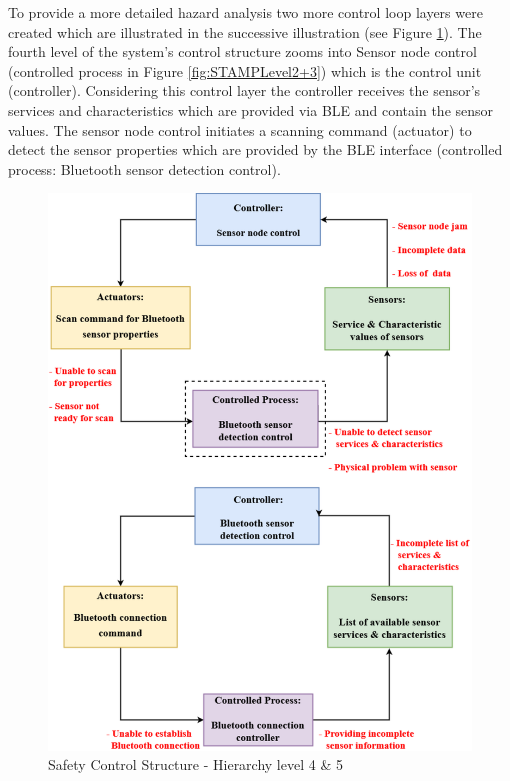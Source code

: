 \documentclass[10pt,journal,compsoc]{IEEEtran}
\begin{document}
	To provide a more detailed hazard analysis two more control loop layers were created which are illustrated in the successive illustration (see Figure  \ref{fig:STAMPLevel4+5}). The fourth level of the system's control structure zooms into Sensor node control (controlled process in Figure \ref{fig:STAMPLevel2+3}) which is the control unit (controller). Considering this control layer the controller receives the sensor's services and characteristics which are provided via BLE and contain the sensor values. The sensor node control initiates a scanning command (actuator) to detect the sensor properties which are provided by the BLE interface (controlled process: Bluetooth sensor detection control).  
	
	\begin{figure}[!ht]
		\centering
		\includegraphics[scale=0.35]{Images/STAMP4+5level(2).eps}
		\caption[Safety Control Structure - Hierarchy level 4 \& 5]{Safety Control Structure - Hierarchy level 4 \& 5}
		\label{fig:STAMPLevel4+5}
	\end{figure}
	
\end{document}
